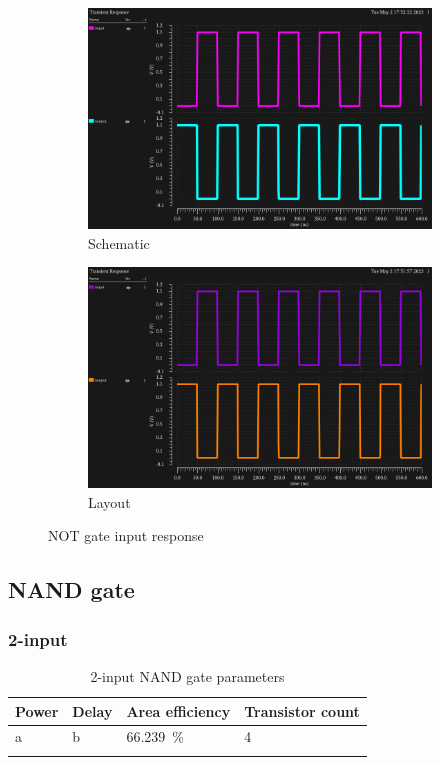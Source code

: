 \begin{figure}[H]
    \begin{subfigure}{0.48\textwidth}
        \includegraphics[width=\textwidth]{./figures/inverter/plot-schematic.png}
        \caption{Schematic}\label{fig:notplotschematic}
    \end{subfigure}
    \hfill
    \begin{subfigure}{0.48\textwidth}
        \includegraphics[width=\textwidth]{./figures/inverter/plot-layout.png}
        \caption{Layout}\label{fig:notplotlayout}
    \end{subfigure}
    \caption{NOT gate input response}
\end{figure}
\clearpage

\subsection{NAND gate}
\subsubsection{2-input}
    \begin{xltabular}{\textwidth}{YYYY}
        Power & Delay & Area efficiency & Transistor count \\
        \hline
        a & b & \qty{66.239}{\percent} & 4 \\
        \hline    
        \caption{2-input NAND gate parameters}
    \end{xltabular}


